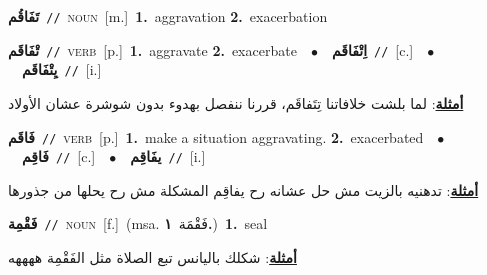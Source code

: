 \documentclass[10pt,a4paper,twoside]{article} %
\begin{document}
\begin{multicols}{2}
{\setlength\topsep{0pt}\textbf{\foreignlanguage{arabic}{تَفَاقُم}}\ {\color{gray}\texttt{//}\color{black}}\ \textsc{noun}\ [m.]\ \textbf{1.}~aggravation  \textbf{2.}~exacerbation\ } \vspace{2mm}

{\setlength\topsep{0pt}\textbf{\foreignlanguage{arabic}{تْفَاقَم}}\ {\color{gray}\texttt{//}\color{black}}\ \textsc{verb}\ [p.]\ \textbf{1.}~aggravate  \textbf{2.}~exacerbate\ \ $\bullet$\ \ \setlength\topsep{0pt}\textbf{\foreignlanguage{arabic}{اِتْفَاقَم}}\ {\color{gray}\texttt{//}\color{black}}\ [c.]\ \ $\bullet$\ \ \setlength\topsep{0pt}\textbf{\foreignlanguage{arabic}{يِتْفَاقَم}}\ {\color{gray}\texttt{//}\color{black}}\ [i.]\  \begin{flushright}\color{gray}\foreignlanguage{arabic}{\textbf{\underline{\foreignlanguage{arabic}{أمثلة}}}: لما بلشت خلافاتنا تِتَفاقَم، قررنا ننفصل بهدوء بدون شوشرة عشان الأولاد}\end{flushright}\color{black}} \vspace{2mm}

{\setlength\topsep{0pt}\textbf{\foreignlanguage{arabic}{فَاقَم}}\ {\color{gray}\texttt{//}\color{black}}\ \textsc{verb}\ [p.]\ \textbf{1.}~make a situation aggravating.  \textbf{2.}~exacerbated\ \ $\bullet$\ \ \setlength\topsep{0pt}\textbf{\foreignlanguage{arabic}{فَاقِم}}\ {\color{gray}\texttt{//}\color{black}}\ [c.]\ \ $\bullet$\ \ \setlength\topsep{0pt}\textbf{\foreignlanguage{arabic}{يفَاقِم}}\ {\color{gray}\texttt{//}\color{black}}\ [i.]\  \begin{flushright}\color{gray}\foreignlanguage{arabic}{\textbf{\underline{\foreignlanguage{arabic}{أمثلة}}}: تدهنيه بالزيت مش حل عشانه رح يفاقِم المشكلة مش رح يحلها من جذورها}\end{flushright}\color{black}} \vspace{2mm}

{\setlength\topsep{0pt}\textbf{\foreignlanguage{arabic}{فَقْمِة}}\ {\color{gray}\texttt{//}\color{black}}\ \textsc{noun}\ [f.]\ \color{gray}(msa. \foreignlanguage{arabic}{فَقْمَة}~\foreignlanguage{arabic}{\textbf{١.}})\color{black}\ \textbf{1.}~seal\  \begin{flushright}\color{gray}\foreignlanguage{arabic}{\textbf{\underline{\foreignlanguage{arabic}{أمثلة}}}: شكلك باليانس تبع الصلاة مثل الفَقْمِة ههههه}\end{flushright}\color{black}} \vspace{2mm}


\end{multicols}
\end{document}
